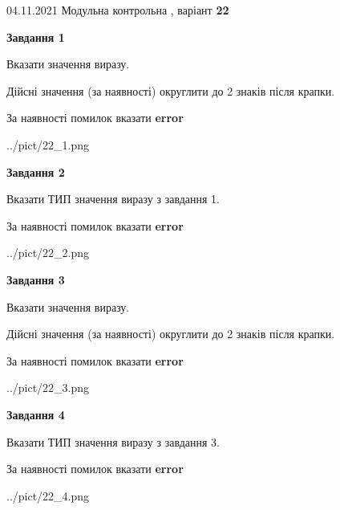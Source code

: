 \documentclass[11pt, ukrainian]{article}
\begin{document}
{04.11.2021 Модульна контрольна , варіант  \No \textbf { 22 }\par}
{
\begin {large}
{\begin {center}\textbf{Завдання 1}\end {center}}\par
Вказати значення виразу. \par
Дійсні значення (за наявності) округлити до 2 знаків після крапки. \par
За наявності помилок вказати \textbf{error}

\begin{center}
	{../pict/22_1.png}
\end{center}
\newpage

{\begin {center}\textbf{Завдання 2}\end {center}}\par
Вказати ТИП значення виразу з завдання 1. \par
За наявності помилок вказати \textbf{error}

\begin{center}
	{../pict/22_2.png}
\end{center}
\newpage

{\begin {center}\textbf{Завдання 3}\end {center}}\par
Вказати значення виразу. \par
Дійсні значення (за наявності) округлити до 2 знаків після крапки. \par
За наявності помилок вказати \textbf{error}

\begin{center}
	{../pict/22_3.png}
\end{center}
\newpage

{\begin {center}\textbf{Завдання 4}\end {center}}\par
Вказати ТИП значення виразу з завдання 3. \par
За наявності помилок вказати \textbf{error}

\begin{center}
	{../pict/22_4.png}
\end{center}
\newpage


\end{large}}
\end{document}
